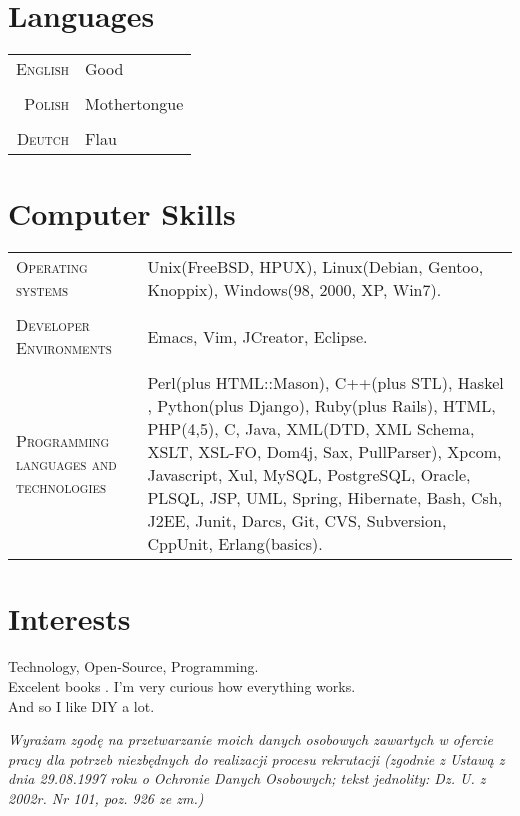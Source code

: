 \documentclass[a4paper,9pt]{article} %
\begin{document}
\section{Languages}

\begin{tabular}{r|l}
\textsc{English} & Good\\
\multicolumn{2}{c}{} \\
\textsc{Polish} & Mothertongue\\
\multicolumn{2}{c}{} \\
\textsc{Deutch} & Flau\\
\end{tabular}


\section{Computer Skills}

\begin{tabular}{K | L}
\textsc{Operating systems} & Unix(FreeBSD, HPUX), Linux(Debian, Gentoo, Knoppix), Windows(98, 2000, XP, Win7).\\
 \\
\textsc{Developer Environments} & Emacs, Vim, JCreator, Eclipse.\\
 \\
\textsc{Programming languages and technologies} & Perl(plus HTML::Mason), C++(plus STL), Haskel ,
Python(plus Django), Ruby(plus Rails), HTML, PHP(4,5), C, Java, XML(DTD, XML Schema, XSLT, XSL-FO,
Dom4j, Sax, PullParser), Xpcom, Javascript, Xul, MySQL, PostgreSQL, Oracle,
PLSQL, JSP, UML, Spring, Hibernate, Bash, Csh, J2EE, Junit, Darcs, Git, CVS,
Subversion, CppUnit, Erlang(basics).\\
\end{tabular}

\section{Interests}

Technology, Open-Source, Programming.\\
Excelent books . I’m very curious how everything works.\\
And so I like DIY a lot.


\vspace*{3\baselineskip}


\textit{\small{Wyrażam zgodę na przetwarzanie moich danych osobowych zawartych w ofercie pracy dla potrzeb niezbędnych do realizacji procesu rekrutacji (zgodnie z Ustawą z dnia 29.08.1997 roku o Ochronie Danych Osobowych; tekst jednolity: Dz. U. z 2002r. Nr 101, poz. 926 ze zm.)}}
\end{document}

